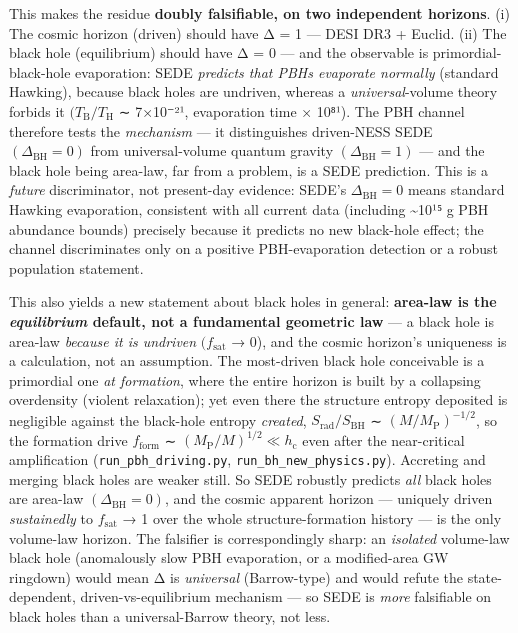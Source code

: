 \documentclass[
  10pt,
]{article}
\begin{document}
This makes the residue \textbf{doubly falsifiable, on two independent
horizons}. (i) The cosmic horizon (driven) should have Δ = 1 --- DESI
DR3 + Euclid. (ii) The black hole (equilibrium) should have Δ = 0 ---
and the observable is primordial-black-hole evaporation: SEDE
\emph{predicts that PBHs evaporate normally} (standard Hawking), because
black holes are undriven, whereas a \emph{universal}-volume theory
forbids it \((T_{\mathrm{B}}/T_{\mathrm{H}}\) ∼ 7×10⁻²¹, evaporation
time × 10⁸¹). The PBH channel therefore tests the \emph{mechanism} ---
it distinguishes driven-NESS SEDE \((\Delta _{\mathrm{BH}} = 0)\) from
universal-volume quantum gravity \((\Delta _{\mathrm{BH}} = 1)\) --- and
the black hole being area-law, far from a problem, is a SEDE prediction.
This is a \emph{future} discriminator, not present-day evidence: SEDE's
\(\Delta _{\mathrm{BH}} = 0\) means standard Hawking evaporation,
consistent with all current data (including \textasciitilde10¹⁵ g PBH
abundance bounds) precisely because it predicts no new black-hole
effect; the channel discriminates only on a positive PBH-evaporation
detection or a robust population statement.

This also yields a new statement about black holes in general:
\textbf{area-law is the \emph{equilibrium} default, not a fundamental
geometric law} --- a black hole is area-law \emph{because it is
undriven} \((f_{\mathrm{sat}}\) → 0), and the cosmic horizon's
uniqueness is a calculation, not an assumption. The most-driven black
hole conceivable is a primordial one \emph{at formation}, where the
entire horizon is built by a collapsing overdensity (violent
relaxation); yet even there the structure entropy deposited is
negligible against the black-hole entropy \emph{created},
\(S_{\mathrm{rad}}/S_{\mathrm{BH}}\) ∼ \((M/M_{\mathrm{P}})^{-1/2}\), so
the formation drive \(f_{\mathrm{form}}\) ∼
\((M_{\mathrm{P}}/M)^{1/2} \ll  h_{\mathrm{c}}\) even after the
near-critical amplification (\texttt{run\_pbh\_driving.py},
\texttt{run\_bh\_new\_physics.py}). Accreting and merging black holes
are weaker still. So SEDE robustly predicts \emph{all} black holes are
area-law \((\Delta _{\mathrm{BH}} = 0)\), and the cosmic apparent
horizon --- uniquely driven \emph{sustainedly} to \(f_{\mathrm{sat}}\) →
1 over the whole structure-formation history --- is the only volume-law
horizon. The falsifier is correspondingly sharp: an \emph{isolated}
volume-law black hole (anomalously slow PBH evaporation, or a
modified-area GW ringdown) would mean Δ is \emph{universal}
(Barrow-type) and would refute the state-dependent,
driven-vs-equilibrium mechanism --- so SEDE is \emph{more} falsifiable
on black holes than a universal-Barrow theory, not less.
\end{document}

